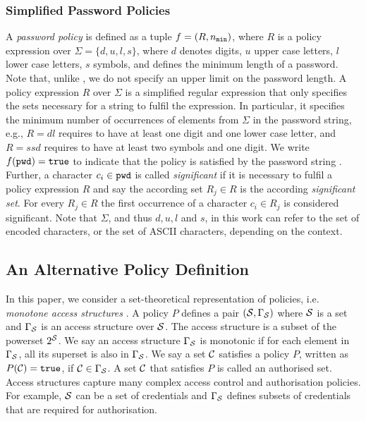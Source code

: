 \subsubsection{Simplified Password Policies}
A \emph{password policy} is defined as a tuple $f=(R,{n_\mathtt{min}})$, where $R$ is a policy expression over $\Sigma=\{d, u, l, s\}$, where $d$ denotes digits, $u$ upper case letters, $l$ lower case letters, $s$ symbols, and \pmin defines the minimum length of a password.
Note that, unlike \cite{KieferM14}, we do not specify an upper limit on the password length.
A policy expression $R$ over $\Sigma$ is a simplified regular expression that only specifies the sets necessary for a string to fulfil the expression.
In particular, it specifies the minimum number of occurrences of elements from $\Sigma$ in the password string, e.g., $R=dl$ requires \pwd to have at least one digit and one lower case letter, and $R=ssd$ requires \pwd to have at least two symbols and one digit.
We write $f(\mathtt{pwd})=\mathtt{true}$ to indicate that the policy is satisfied by the password string \pwd.
Further, a character $c_i\in\mathtt{pwd}$ is called \emph{significant} if it is necessary to fulfil a policy expression $R$ and say the according set $R_j\in R$ is the according \emph{significant set}.
For every $R_j\in R$ the first occurrence of a character $c_i\in R_j$ is considered significant.
Note that $\Sigma$, and thus $d,u,l$ and $s$, in this work can refer to the set of encoded characters, or the set of ASCII characters, depending on the context.

\subsection{An Alternative Policy Definition} \label{sec:lsss}
In this paper, we consider a set-theoretical representation of policies, i.e. \emph{monotone access structures} \cite{ito89}. A policy $P$ defines a pair $(\mathcal{S},\Gamma_\mathcal{S})$ where $\mathcal{S}$ is a set and $\Gamma_\mathcal{S}$ is an access structure over $\mathcal{S}$. 
The access structure is a subset of the powerset $2^\mathcal{S}$. 
We say an access structure $\Gamma_\mathcal{S}$ is monotonic if for each element in $\Gamma_\mathcal{S}$, all its superset is also in $\Gamma_\mathcal{S}$. 
We say a set $\mathcal{C}$ satisfies a policy $P$, written as $P(\mathcal{C})=\mathtt{true}$, if $\mathcal{C}\in \Gamma_\mathcal{S}$. A set $\mathcal{C}$ that satisfies $P$ is called an authorised set. 
Access structures capture many complex access control and authorisation policies. For example, $\mathcal{S}$ can be a set of credentials and $\Gamma_\mathcal{S}$ defines subsets of credentials that are required for authorisation.

